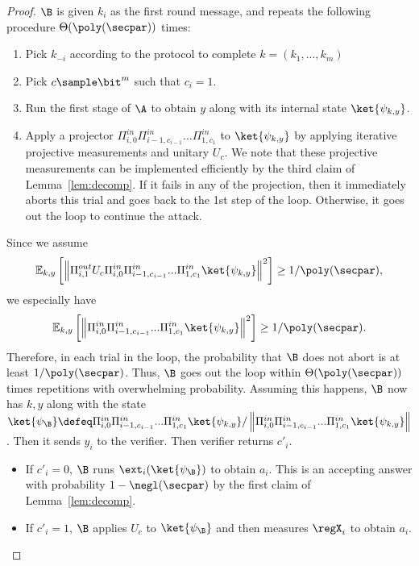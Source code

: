 \begin{proof}
$\B$ is given $k_i$ as the first round message, and repeats the following procedure $\Theta(\poly(\secpar))$ times:
\begin{enumerate}
\item Pick $k_{-i}$ according to the protocol to complete $k=(k_1,...,k_m)$
\item Pick $c\sample \bit^{m}$ such that $c_i=1$.
\item Run the first stage of $\A$ to obtain $y$ along with its internal state $\ket{\psi_{k,y}}$.
\item Apply a projector $\Pi_{i,0}^{in}\Pi_{i-1,c_{i-1}}^{in}...\Pi_{1,c_1}^{in}$ to $\ket{\psi_{k,y}}$ by applying iterative projective measurements and unitary $U_c$. We note that these projective measurements can be implemented efficiently by the third claim of  Lemma~\ref{lem:decomp}. 
If it fails in any of the projection, then it immediately aborts this trial and goes back to the 1st step of the loop.
Otherwise, it goes out the loop to continue the attack.
\end{enumerate}
Since we assume \begin{align*}
    \mathbb{E}_{k,y}\left[\left\|\Pi_{i,1}^{out}U_c\Pi_{i,0}^{in}\Pi_{i-1,c_{i-1}}^{in}...\Pi_{1,c_1}^{in}\ket{\psi_{k,y}}\right\|^2\right]\geq 1/\poly(\secpar),
\end{align*}
we especially have  
\begin{align*}
\mathbb{E}_{k,y}\left[\left\|\Pi_{i,0}^{in}\Pi_{i-1,c_{i-1}}^{in}...\Pi_{1,c_1}^{in}\ket{\psi_{k,y}}\right\|^2\right]\geq 1/\poly(\secpar).
\end{align*}
Therefore, in each trial in the loop, the probability that $\B$ does not abort is at least $1/\poly(\secpar)$. 
Thus, $\B$ goes out the loop within $\Theta(\poly(\secpar))$ times repetitions with overwhelming probability.
Assuming this happens, $\B$ now has $k,y$ along with the state $\ket{\psi_{\B}}\defeq\Pi_{i,0}^{in}\Pi_{i-1,c_{i-1}}^{in}...\Pi_{1,c_1}^{in}\ket{\psi_{k,y}}/\left\|\Pi_{i,0}^{in}\Pi_{i-1,c_{i-1}}^{in}...\Pi_{1,c_1}^{in}\ket{\psi_{k,y}}\right\|$.
Then it sends $y_i$ to the verifier.
Then verifier returns $c'_i$.
\begin{itemize}
\item If $c'_i=0$, $\B$ runs $\ext_i(\ket{\psi_{\B}})$ to obtain $a_i$. This is an accepting answer with probability $1-\negl(\secpar)$ by the first claim of  Lemma~\ref{lem:decomp}.
\item If $c'_i=1$, $\B$ applies $U_c$ to $\ket{\psi_{\B}}$ and then measures $\regX_i$ to obtain $a_i$. 

\end{itemize}
\end{proof}

